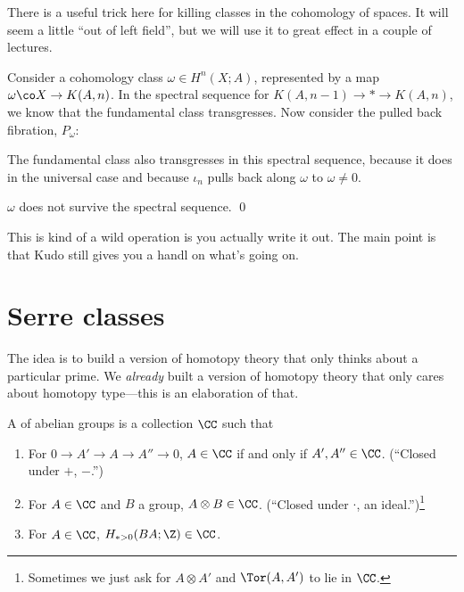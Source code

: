 There is a useful trick here for killing classes in the cohomology of spaces.  It will seem a little ``out of left field'', but we will use it to great effect in a couple of lectures.

Consider a cohomology class $\omega \in H^n(X; A)$, represented by a map $\omega\co X \to K(A, n)$.  In the spectral sequence for $K(A, n-1) \to * \to K(A, n)$, we know that the fundamental class transgresses.  Now consider the pulled back fibration, $P_\omega$:
\begin{center}
\end{center}
The fundamental class also transgresses in this spectral sequence, because it does in the universal case and because $\iota_n$ pulls back along $\omega$ to $\omega \ne 0$.

\begin{corollary}
$\omega$ does not survive the spectral sequence. \qed
\end{corollary}

This is kind of a wild operation is you actually write it out.  The main point is that Kudo still gives you a handl on what's going on.





\section{Serre classes}


The idea is to build a version of homotopy theory that only thinks about a particular prime.  We \emph{already} built a version of homotopy theory that only cares about homotopy type---this is an elaboration of that.

\begin{definition}
A  of abelian groups is a collection $\CC$ such that
\begin{enumerate}
    \item For $0 \to A' \to A \to A'' \to 0$, $A \in \CC$ if and only if $A', A'' \in \CC$.  (``Closed under $+$, $-$.'')
    \item For $A \in \CC$ and $B$ a group, $A \otimes B \in \CC$.  (``Closed under $\cdot$, an ideal.'')\footnote{Sometimes we just ask for $A \otimes A'$ and $\Tor(A, A')$ to lie in $\CC$.}
    \item For $A \in \CC$, $H_{* > 0}(BA; \Z) \in \CC$.
\end{enumerate}
\end{definition}

